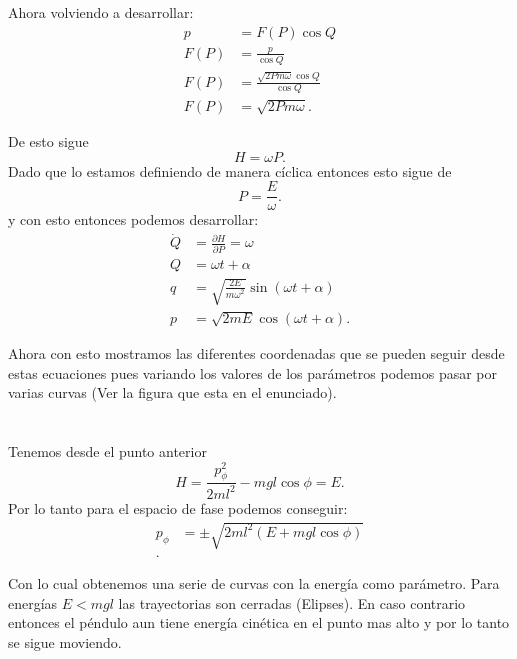 \documentclass{report}
\begin{document}
Ahora volviendo a desarrollar:
\begin{align*}
  p &= F(P) \cos Q \\
  F\left( P \right) &= \frac{p}{\cos Q} \\
  F\left( P \right) &= \frac{\sqrt{2Pm\omega} \cos Q}{\cos Q} \\
  F\left( P \right) &= \sqrt{2Pm\omega}
.\end{align*}

De esto sigue \[
H = \omega P
.\] Dado que lo estamos definiendo de manera cíclica entonces esto sigue de \[
P = \frac{E}{\omega}
.\] y con esto entonces podemos desarrollar:
\begin{align*}
  \dot{Q} &= \frac{\partial H}{\partial P} = \omega\\
  Q &= \omega t + \alpha \\
  q &= \sqrt{\frac{2E}{m\omega^2}} \sin\left( \omega t + \alpha \right)  \\
  p &= \sqrt{2 mE} \cos\left( \omega t + \alpha \right)
.\end{align*}

Ahora con esto mostramos las diferentes coordenadas que se pueden seguir desde estas ecuaciones pues variando los valores de los parámetros podemos pasar por varias curvas (Ver la figura que esta en el enunciado).

\chapter{}

Tenemos desde el punto anterior \[
H = \frac{p_\phi^2}{2ml^2}- mgl\cos\phi = E
.\] Por lo tanto para el espacio de fase podemos conseguir:
\begin{align*}
  p_\phi &= \pm \sqrt{2ml^2\left( E + mgl\cos\phi \right) }  \\
.\end{align*}

Con lo cual obtenemos una serie de curvas con la energía como parámetro. Para energías $E < mgl$ las trayectorias son cerradas (Elipses). En caso contrario entonces el péndulo aun tiene energía cinética en el punto mas alto y por lo tanto se sigue moviendo.
\end{document}
